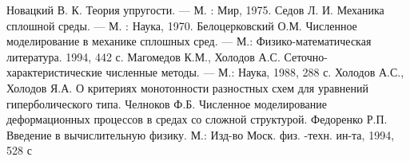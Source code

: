 \begin{thebibliography}{99}
Новацкий В. К. Теория упругости. — М. : Мир, 1975.
Седов Л. И. Механика сплошной среды. — М. : Наука, 1970.
Белоцерковский О.М. Численное моделирование в механике
сплошных сред. — М.: Физико-математическая литература. 1994, 442 с.
Магомедов К.М., Холодов А.С. Сеточно-характеристические
численные методы. — М.: Наука, 1988, 288 с.
Холодов А.С., Холодов Я.А. О критериях монотонности разностных
схем для уравнений гиперболического типа. 
Челноков Ф.Б. Численное моделирование деформационных
процессов в средах со сложной структурой.
Федоренко Р.П. Введение в вычислительную физику. М.:
Изд-во Моск. физ. -техн. ин-та, 1994, 528 с 
\end{thebibliography}

